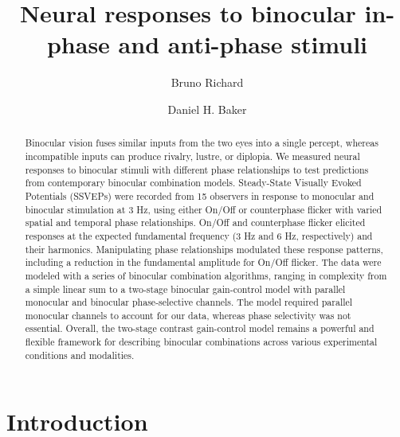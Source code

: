 \documentclass[
  12pt,
]{article}
\title{Neural responses to binocular in-phase and anti-phase stimuli}
\author[1]{Bruno Richard}
\author[2]{Daniel H. Baker}
\affil[1]{Department of Math and Computer Sciences, Rutgers
University, Newark, New Jersey, USA}
\affil[2]{Department of Psychology, University of York, York, UK}
\date{}
\begin{document}
\maketitle
\begin{abstract}
Binocular vision fuses similar inputs from the two eyes into a single
percept, whereas incompatible inputs can produce rivalry, lustre, or
diplopia. We measured neural responses to binocular stimuli with
different phase relationships to test predictions from contemporary
binocular combination models. Steady-State Visually Evoked Potentials
(SSVEPs) were recorded from 15 observers in response to monocular and
binocular stimulation at 3 Hz, using either On/Off or counterphase
flicker with varied spatial and temporal phase relationships. On/Off and
counterphase flicker elicited responses at the expected fundamental
frequency (3 Hz and 6 Hz, respectively) and their harmonics.
Manipulating phase relationships modulated these response patterns,
including a reduction in the fundamental amplitude for On/Off flicker.
The data were modeled with a series of binocular combination algorithms,
ranging in complexity from a simple linear sum to a two-stage binocular
gain-control model with parallel monocular and binocular phase-selective
channels. The model required parallel monocular channels to account for
our data, whereas phase selectivity was not essential. Overall, the
two-stage contrast gain-control model remains a powerful and flexible
framework for describing binocular combinations across various
experimental conditions and modalities.
\end{abstract}

\section{Introduction}\label{introduction}
\end{document}
